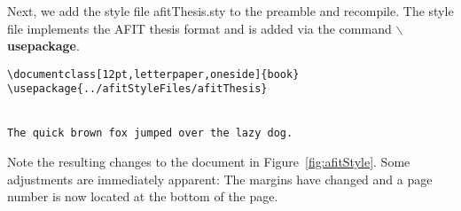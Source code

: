 Next, we add the style file afitThesis.sty to the preamble and
recompile.  The style file implements the AFIT thesis format and is
added via the command {\bf $\backslash$usepackage}.

\vspace{-0.3in}
{\singlespace
\begin{verbatim}
\documentclass[12pt,letterpaper,oneside]{book}
\usepackage{../afitStyleFiles/afitThesis}


The quick brown fox jumped over the lazy dog.

\end{verbatim}
} \noindent Note the resulting changes to the document in
Figure~\ref{fig:afitStyle}.  Some adjustments are immediately apparent:
The margins have changed and a page number is now located at the
bottom of the page.
    

